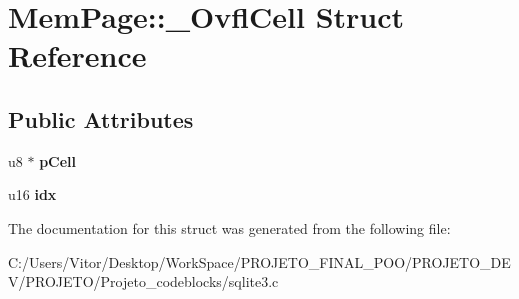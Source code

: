 \hypertarget{struct_mem_page_1_1___ovfl_cell}{\section{Mem\-Page\-:\-:\-\_\-\-Ovfl\-Cell Struct Reference}
\label{struct_mem_page_1_1___ovfl_cell}
}
\subsection*{Public Attributes}
\begin{DoxyCompactItemize}
\item 
\hypertarget{struct_mem_page_1_1___ovfl_cell_a75c64097a5af396bbdc30e859f33a7c9}{u8 $\ast$ {\bfseries p\-Cell}}\label{struct_mem_page_1_1___ovfl_cell_a75c64097a5af396bbdc30e859f33a7c9}

\item 
\hypertarget{struct_mem_page_1_1___ovfl_cell_ad10c93756d29693601aa63923a7fbee3}{u16 {\bfseries idx}}\label{struct_mem_page_1_1___ovfl_cell_ad10c93756d29693601aa63923a7fbee3}

\end{DoxyCompactItemize}


The documentation for this struct was generated from the following file\-:\begin{DoxyCompactItemize}
\item 
C\-:/\-Users/\-Vitor/\-Desktop/\-Work\-Space/\-P\-R\-O\-J\-E\-T\-O\-\_\-\-F\-I\-N\-A\-L\-\_\-\-P\-O\-O/\-P\-R\-O\-J\-E\-T\-O\-\_\-\-D\-E\-V/\-P\-R\-O\-J\-E\-T\-O/\-Projeto\-\_\-codeblocks/sqlite3.\-c\end{DoxyCompactItemize}
